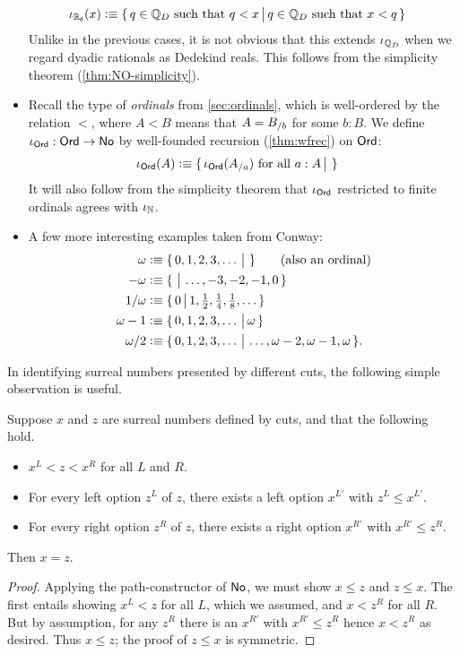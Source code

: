 \begin{itemize}
\begin{align*}
    \iota_{\mathbb{R}_\mathsf{d}}(x) &\vcentcolon\equiv
    \{\,q\in\mathbb{Q}_D \text{ such that } q<x\,\big|\,q\in\mathbb{Q}_D \text{ such that } x<q\,\}
  \end{align*}
  Unlike in the previous cases, it is not obvious that this extends $\iota_{\mathbb{Q}_D}$ when we regard dyadic rationals as Dedekind reals.
  This follows from the simplicity theorem (\autoref{thm:NO-simplicity}).
\item Recall the type \ord of \emph{ordinals} from \autoref{sec:ordinals}, which is well-ordered by the relation $<$, where $A<B$ means that $A = {B}_{/b}$ for some $b:B$.
  We define $\iota_{\mathsf{Ord}}:\mathsf{Ord}\to\mathsf{No}$ by well-founded recursion (\autoref{thm:wfrec}) on $\mathsf{Ord}$:
  \begin{align*}
    \iota_{\mathsf{Ord}}(A) &\vcentcolon\equiv
    \{\,\iota_\mathsf{Ord}({A}_{/a}) \text{ for all } a:A\,\big|\,\,\}
  \end{align*}
  It will also follow from the simplicity theorem that $\iota_\mathsf{Ord}$ restricted to finite ordinals agrees with $\iota_\mathbb{N}$.
\item A few more interesting examples taken from Conway:
  \begin{align*}
    \omega &\vcentcolon\equiv \{\,0,1,2,3,\dots\,\big|\,\,\} \qquad\text{(also an ordinal)}\\
    -\omega &\vcentcolon\equiv \{\,\,\big|\,\dots,-3,-2,-1,0\,\}\\
    1/\omega &\vcentcolon\equiv \textstyle\{\,0\,\big|\,1,\frac12,\frac14,\frac18,\dots\,\}\\
    \omega-1 &\vcentcolon\equiv \{\,0,1,2,3,\dots\,\big|\,\omega\,\}\\
    \omega/2 &\vcentcolon\equiv \{\,0,1,2,3,\dots\,\big|\,\dots,\omega-2,\omega-1,\omega\,\}.
  \end{align*}
\end{itemize}

In identifying surreal numbers presented by different cuts, the following simple observation is useful.

\begin{thm}\label{thm:NO-simplicity}
  Suppose $x$ and $z$ are surreal numbers defined by cuts, and that the following hold.
  \begin{itemize}
  \item $x^L < z < x^R$ for all $L$ and $R$.
  \item For every left option $z^L$ of $z$, there exists a left option $x^{L'}$ with $z^L\le x^{L'}$.
  \item For every right option $z^R$ of $z$, there exists a right option $x^{R'}$ with $x^{R'}\le z^R$.
  \end{itemize}
  Then $x=z$.
\end{thm}
\begin{proof}
  Applying the path-constructor of $\mathsf{No}$, we must show $x\le z$ and $z\le x$.
  The first entails showing $x^L<z$ for all $L$, which we assumed, and $x<z^R$ for all $R$.
  But by assumption, for any $z^R$ there is an $x^{R'}$ with $x^{R'}\le z^R$ hence $x<z^R$ as desired.
  Thus $x\le z$; the proof of $z\le x$ is symmetric.
\end{proof}

